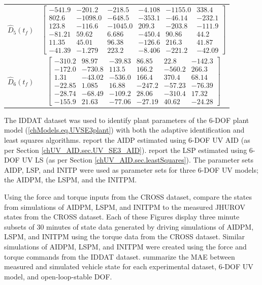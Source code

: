 \begin{table}[htbp]
\begin{center}
\begin{tabular}{c|c}
$\hat{D}_5(t_f)$ & $ \left[\begin{array}{cccccc} -541.9 & -201.2 & -218.5 & -4.108 & -1155.0 & 338.4\\ 802.6 & -1098.0 & -648.5 & -353.1 & -46.14 & -232.1\\ 123.8 & -116.6 & -1045.0 & 209.3 & -203.8 & -111.9\\ -81.21 & 59.62 & 6.686 & -450.4 & 90.86 & 44.2\\ 11.35 & 45.01 & 96.38 & -126.6 & 216.3 & 41.87\\ -41.39 & -1.279 & 223.2 & -8.406 & -221.2 & -42.09 \end{array}\right] $ \\ 
$\hat{D}_6(t_f)$ & $ \left[\begin{array}{cccccc} -310.2 & 98.97 & -39.83 & 86.85 & 22.8 & -142.3\\ -172.0 & -730.8 & 113.5 & 166.2 & -560.2 & 266.3\\ 1.31 & -43.02 & -536.0 & 166.4 & 370.4 & 68.14\\ -22.85 & 1.085 & 16.88 & -247.2 & -57.23 & -76.39\\ -28.74 & -68.49 & -109.2 & 28.06 & -310.4 & 17.32\\ -155.9 & 21.63 & -77.06 & -27.19 & 40.62 & -24.28 \end{array}\right] $ \\ 
\end{tabular}
\end{center}
\label{chUV_AID.tb.UVSE3_LS_dragParam}
\end{table}


The \ac{IDDAT} dataset was used to identify plant parameters of the
6-\ac{DOF} plant model (\ref{chModels.eq.UVSE3plant}) with both the
adaptive identification and least squares algorithms.
%
report the \acf{AIDP} estimated using  6-\ac{DOF} \ac{UV} \ac{AID} (as
per Section \ref{chUV_AID.sec.UV_SE3_AID}).
%
report the \acf{LSP}  estimated using 6-\ac{DOF} \ac{UV} \ac{LS} (as
per Section \ref{chUV_AID.sec.leastSquares}).
%
The parameter sets \ac{AIDP}, \ac{LSP}, and \ac{INITP} were used as
 parameter sets for three 6-\ac{DOF} \ac{UV} models;
the \acf{AIDPM}, the \acf{LSPM}, and the \acf{INITPM}.


Using the force and torque inputs from the \ac{CROSS} dataset,
compare the states from simulations of \ac{AIDPM},
\ac{LSPM}, and \ac{INITPM} to the measured \ac{JHUROV} states from
the \ac{CROSS} dataset.
%
Each of these Figures display three minute subsets of 30 minutes of
state data generated by driving simulations of \ac{AIDPM},
\ac{LSPM}, and \ac{INITPM} using the torque data from the \ac{CROSS}
dataset.
%
Similar simulations of \ac{AIDPM}, \ac{LSPM}, and \ac{INITPM} were
created using the force and torque commands from the \ac{IDDAT} dataset.
%
 summarize the \ac{MAE} between
measured and simulated vehicle state for each experimental dataset,
6-\ac{DOF} \ac{UV} model, 
and open-loop-stable \ac{DOF}.


